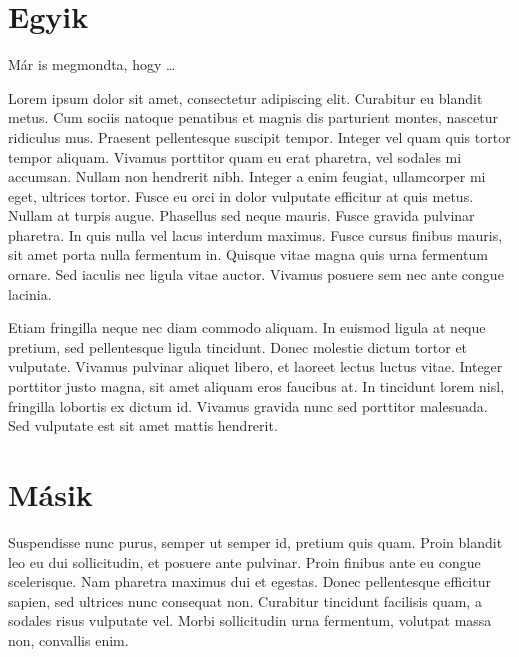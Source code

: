 \documentclass[12pt,a4paper]{report}
\begin{document}
\chapter{Egyik} \label{ch:bev}
\setcounter{page}{1} 

Már  is megmondta, hogy \dots

Lorem ipsum dolor sit amet, consectetur adipiscing elit. Curabitur eu blandit metus. Cum sociis natoque penatibus et magnis dis parturient montes, nascetur ridiculus mus. Praesent pellentesque suscipit tempor. Integer vel quam quis tortor tempor aliquam. Vivamus porttitor quam eu erat pharetra, vel sodales mi accumsan. Nullam non hendrerit nibh. Integer a enim feugiat, ullamcorper mi eget, ultrices tortor. Fusce eu orci in dolor vulputate efficitur at quis metus. Nullam at turpis augue. Phasellus sed neque mauris. Fusce gravida pulvinar pharetra. In quis nulla vel lacus interdum maximus. Fusce cursus finibus mauris, sit amet porta nulla fermentum in. Quisque vitae magna quis urna fermentum ornare. Sed iaculis nec ligula vitae auctor. Vivamus posuere sem nec ante congue lacinia.

Etiam fringilla neque nec diam commodo aliquam. In euismod ligula at neque pretium, sed pellentesque ligula tincidunt. Donec molestie dictum tortor et vulputate. Vivamus pulvinar aliquet libero, et laoreet lectus luctus vitae. Integer porttitor justo magna, sit amet aliquam eros faucibus at. In tincidunt lorem nisl, fringilla lobortis ex dictum id. Vivamus gravida nunc sed porttitor malesuada. Sed vulputate est sit amet mattis hendrerit.

\chapter{Másik}

Suspendisse nunc purus, semper ut semper id, pretium quis quam. Proin blandit leo eu dui sollicitudin, et posuere ante pulvinar. Proin finibus ante eu congue scelerisque. Nam pharetra maximus dui et egestas. Donec pellentesque efficitur sapien, sed ultrices nunc consequat non. Curabitur tincidunt facilisis quam, a sodales risus vulputate vel. Morbi sollicitudin urna fermentum, volutpat massa non, convallis enim.
\end{document}
